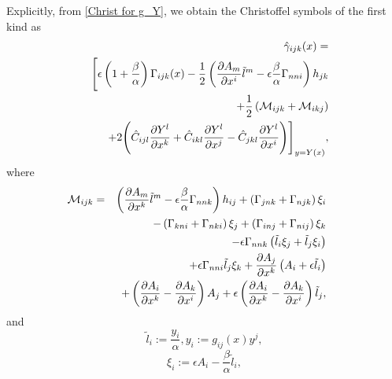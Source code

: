 \documentclass[aps,superscriptaddress, showpacs,preprintnumbers, superscriptaddress, nofootinbibt,twocolumn]{revtex4-2}
\begin{document}
Explicitly, from \eqref{Christ for g_Y}, we obtain the Christoffel symbols of the first kind as
\begin{eqnarray}\label{eq36}
&&\hat{\gamma}_{ijk}(x)=\nonumber\\
&&\Bigg[ \epsilon \left( 1+\frac{\beta }{\alpha }%
\right) \Gamma _{ijk}(x)-\frac{1}{2}\left( \frac{\partial A_{m}}{\partial x^{i}}\tilde{%
l}^{m}-\epsilon \frac{\beta }{\alpha }{\Gamma}_{nni}\right) h
_{jk}\nonumber\\
&&+\frac{1}{2}\left(\mathcal{M}_{ijk}+\mathcal{M}_{ikj}\right)\nonumber\\
&&+2\Bigg( \hat{C}_{ijl}\frac{%
\partial Y^{l}}{\partial x^{k}}+\hat{C}_{ikl}\frac{\partial Y^{l}}{\partial
x^{j}}-
\hat{C}_{jkl}\frac{\partial Y^{l}}{\partial x^{i}}\Bigg) \Bigg]
_{y=Y(x)},
\end{eqnarray}
where
\begin{eqnarray}\label{eq37}
\hspace{-0.5cm}\mathcal{M}_{ijk} &=&\left( \frac{\partial A_{m}}{\partial x^{k}}\tilde{l}%
^{m}-\epsilon \frac{\beta }{\alpha }{\Gamma}_{nnk}\right) h
_{ij}+\left( \Gamma _{jnk}+\Gamma _{njk}\right) \xi _{i}\nonumber\\
\hspace{-0.5cm}&&-\left( \Gamma
_{kni}+\Gamma _{nki}\right) \xi _{j}
+\left( \Gamma
_{inj}+\Gamma _{nij}\right) \xi _{k}\nonumber\\
\hspace{-0.5cm}&&
-\epsilon {\Gamma}_{nnk}\left(
\tilde{l}_{i}\xi _{j}+\tilde{l}_{j}\xi _{i}\right) \nonumber\\
\hspace{-0.5cm}&&+\epsilon {\Gamma%
}_{nni}\tilde{l}_{j}\xi _{k}+
\frac{\partial A_{j}}{\partial x^{k}}\left( A_i+\epsilon\tilde{l}_{i}\right) \nonumber\\
\hspace{-0.5cm}&&+\left( \frac{\partial A_{i}}{\partial x^{k}}-\frac{\partial
A_{k}}{\partial x^{i}}\right) A_{j}+\epsilon \left( \frac{\partial A_{i}}{\partial x^{k}}-\frac{%
\partial A_{k}}{\partial x^{i}}\right) \tilde{l}_{j},
\end{eqnarray}
and
\begin{equation}
\tilde{l}_{i}:=\frac{y_{i}}{\alpha },y_{i}:=g_{ij}(x)y^{j},
\end{equation}
\begin{equation}
\xi _{i}:=\epsilon A_{i}-\frac{\beta }{\alpha }%
\tilde{l}_{i},
\end{equation}
\end{document}
